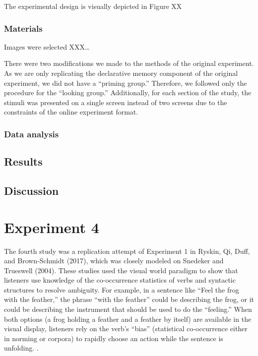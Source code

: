 \documentclass[
  english,
  man,floatsintext]{apa6}
\begin{document}
The experimental design is visually depicted in Figure XX

\hypertarget{materials}{%
\subsubsection{Materials}\label{materials}}

Images were selected XXX\ldots{}

There were two modifications we made to the methods of the original experiment. As we are only replicating the declarative memory component of the original experiment, we did not have a ``priming group.'' Therefore, we followed only the procedure for the ``looking group.'' Additionally, for each section of the study, the stimuli was presented on a single screen instead of two screens due to the constraints of the online experiment format.

\hypertarget{data-analysis-1}{%
\subsubsection{Data analysis}\label{data-analysis-1}}

\hypertarget{results-2}{%
\subsection{Results}\label{results-2}}

\hypertarget{discussion-2}{%
\subsection{Discussion}\label{discussion-2}}

\hypertarget{experiment-4}{%
\section{Experiment 4}\label{experiment-4}}

The fourth study was a replication attempt of Experiment 1 in Ryskin, Qi, Duff, and Brown-Schmidt (2017), which was closely modeled on Snedeker and Trueswell (2004). These studies used the visual world paradigm to show that listeners use knowledge of the co-occurrence statistics of verbs and syntactic structures to resolve ambiguity. For example, in a sentence like ``Feel the frog with the feather,'' the phrase ``with the feather'' could be describing the frog, or it could be describing the instrument that should be used to do the ``feeling.'' When both options (a frog holding a feather and a feather by itself) are available in the visual display, listeners rely on the verb's ``bias'' (statistical co-occurrence either in norming or corpora) to rapidly choose an action while the sentence is unfolding.
.
\end{document}
